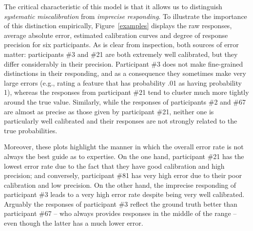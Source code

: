 \documentclass[doc]{apa6} %
\begin{document}


The critical characteristic of this model is that it allows us to distinguish {\it systematic miscalibration} from {\it imprecise responding}. To illustrate the importance of this distinction empirically, Figure~\ref{examples} displays the raw responses, average absolute error, estimated calibration curves and degree of response precision for six participants. As is clear from inspection, both sources of error matter: participants \#3 and \#21 are both extremely well calibrated, but they differ considerably in their precision. Participant \#3 does not make fine-grained distinctions in their responding, and as a consequence they sometimes make very large errors (e.g., rating a feature that has probability .01 as having probability 1), whereas the responses from participant \#21 tend to cluster much more tightly around the true value. Similarly, while the responses of participants \#2 and \#67 are almost as precise as those given by participant \#21, neither one is particularly well calibrated and their responses are not strongly related to the true probabilities.

Moreover, these plots highlight the manner in which the overall error rate is not always the best guide as to expertise. On the one hand, participant \#21 has the lowest error rate due to the fact that they have good calibration and high precision; and conversely, participant \#81 has very high error due to their poor calibration and low precision. On the other hand, the imprecise responding of participant \#3 leads to a very high error rate despite being very well calibrated. Arguably the responses of participant \#3 reflect the ground truth better than participant \#67 -- who always provides responses in the middle of the range -- even though the latter has a much lower error.
\end{document}
